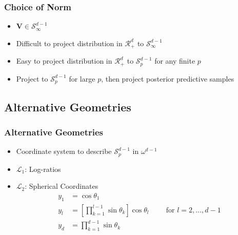 \documentclass[aspectratio=169]{beamer}
\begin{document}
\begin{frame}
  \frametitle{Choice of Norm}
  \begin{itemize}
    \item $\bm{V} \in \mathcal{S}_{\infty}^{d-1}$
    \pause
    \item Difficult to project distribution in $\mathcal{R}_+^{d}$ to $\mathcal{S}_{\infty}^{d-1}$
    \pause
    \item Easy to project distribution in $\mathcal{R}_+^{d}$ to $\mathcal{S}_{p}^{d-1}$ for any finite $p$
    \pause
    \item Project to $\mathcal{S}_{p}^{d-1}$ for large $p$, then project posterior predictive samples
  \end{itemize}
\end{frame}

\subsection{Alternative Geometries}

\begin{frame}
  \frametitle{Alternative Geometries}
  \begin{itemize}
    \item Coordinate system to describe $\mathcal{S}_p^{d-1}$ in $\omega^{d-1}$
    \item $\mathcal{L}_1$: Log-ratios
    \item $\mathcal{L}_2$: Spherical Coordinates
      \begin{equation}
        \label{eqn:spherical}
        \begin{aligned}
          y_1 &= \cos\theta_1\\
          y_l &= \left[{\textstyle\prod}_{k = 1}^{l-1}\sin\theta_k\right]\cos\theta_l
                                    \hspace{1cm}\text{for } l = 2,\ldots,d-1\\
          y_d &= {\textstyle\prod}_{k = 1}^{d-1}\sin\theta_k
        \end{aligned}
      \end{equation}
  \end{itemize}
\end{frame}
\end{document}
